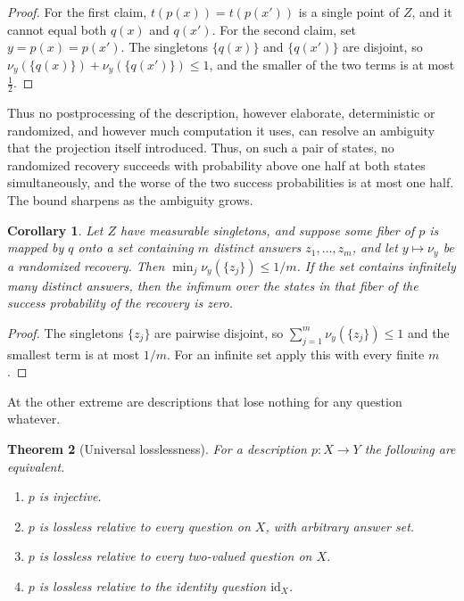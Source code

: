\documentclass[11pt]{article}
\newtheorem{theorem}{Theorem}[section]
\newtheorem{corollary}[theorem]{Corollary}
\theoremstyle{definition}
\theoremstyle{remark}
\begin{document}
\begin{proof}
For the first claim, $t(p(x))=t(p(x'))$ is a single point of $Z$, and it cannot equal both $q(x)$ and $q(x')$. For the second claim, set $y=p(x)=p(x')$. The singletons $\{q(x)\}$ and $\{q(x')\}$ are disjoint, so $\nu_y(\{q(x)\})+\nu_y(\{q(x')\})\le1$, and the smaller of the two terms is at most $\tfrac12$.
\end{proof}

Thus no postprocessing of the description, however elaborate, deterministic or randomized, and however much computation it uses, can resolve an ambiguity that the projection itself introduced. Thus, on such a pair of states, no randomized recovery succeeds with probability above one half at both states simultaneously, and the worse of the two success probabilities is at most one half. The bound sharpens as the ambiguity grows.

\begin{corollary}\label{cor:ambiguity}
Let $Z$ have measurable singletons, and suppose some fiber of $p$ is mapped by $q$ onto a set containing $m$ distinct answers $z_1,\dots,z_m$, and let $y\mapsto\nu_y$ be a randomized recovery. Then $\min_{j}\nu_y(\{z_j\})\le 1/m$. If the set contains infinitely many distinct answers, then the infimum over the states in that fiber of the success probability of the recovery is zero.
\end{corollary}

\begin{proof}
The singletons $\{z_j\}$ are pairwise disjoint, so $\sum_{j=1}^m\nu_y(\{z_j\})\le1$ and the smallest term is at most $1/m$. For an infinite set apply this with every finite $m$.
\end{proof}

At the other extreme are descriptions that lose nothing for any question whatever.

\begin{theorem}[Universal losslessness]\label{thm:universal}
For a description $p:X\to Y$ the following are equivalent.
\begin{enumerate}
\item[\textup{(i)}] $p$ is injective.
\item[\textup{(ii)}] $p$ is lossless relative to every question on $X$, with arbitrary answer set.
\item[\textup{(iii)}] $p$ is lossless relative to every two-valued question on $X$.
\item[\textup{(iv)}] $p$ is lossless relative to the identity question $\mathrm{id}_X$.
\end{enumerate}
\end{theorem}
\end{document}
